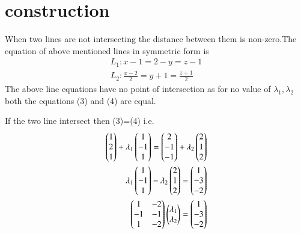 \documentclass[journal,12pt,twocolumn]{IEEEtran}
\begin{document}
\section{construction}
When two lines are not intersecting the distance between them is non-zero.The equation of above mentioned lines in symmetric form is
\begin{align}
    L_1\colon x-1=2-y=z-1\\
    L_2\colon \frac{x-2}{2}=y+1=\frac{z+1}{2}
\end{align}
The above line equations have no point of intersection as for no value of $\lambda_1,\lambda_2$ both the equations (3) and (4) are equal.\par
If the two line intersect then (3)=(4) i.e.
\begin{align}
    \begin{pmatrix}1\\2\\1\end{pmatrix}+\lambda_1\begin{pmatrix}1\\-1\\1\end{pmatrix}=\begin{pmatrix}2\\-1\\-1\end{pmatrix}+\lambda_2\begin{pmatrix}2\\1\\2\end{pmatrix}\notag\\
    \lambda_1\begin{pmatrix}1\\-1\\1\end{pmatrix}-\lambda_2\begin{pmatrix}2\\1\\2\end{pmatrix}=\begin{pmatrix}1\\-3\\-2\end{pmatrix}\notag\\
    \begin{pmatrix}1 & -2\\-1 & -1\\1 & -2\end{pmatrix}\begin{pmatrix}\lambda_1\\\lambda_2\end{pmatrix}=\begin{pmatrix}1\\-3\\-2\end{pmatrix}\notag\\

\end{align}
\end{document}
